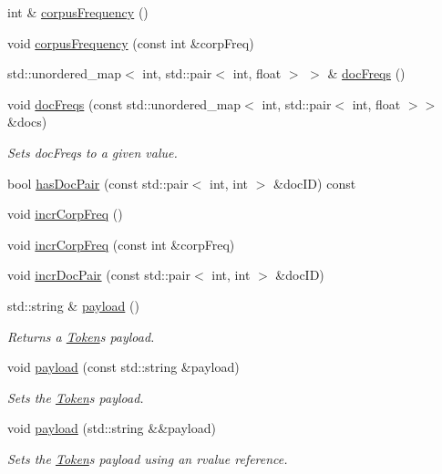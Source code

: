 \begin{DoxyCompactItemize}
int \& \hyperlink{class_token_a2f643ffd68e0d9f6fc3a812337cba728}{corpus\+Frequency} ()
\item 
void \hyperlink{class_token_a96f7a2357460942a79f4c83edfc5328e}{corpus\+Frequency} (const int \&corp\+Freq)
\item 
std\+::unordered\+\_\+map$<$ int, std\+::pair$<$ int, float $>$ $>$ \& \hyperlink{class_token_ae6baab69fb2340897f5a96a824b59296}{doc\+Freqs} ()
\item 
void \hyperlink{class_token_ad72b4a41e4b59f38a60749f4f5f7d839}{doc\+Freqs} (const std\+::unordered\+\_\+map$<$ int, std\+::pair$<$ int, float $>$$>$ \&docs)
\begin{DoxyCompactList}\small\item\em Sets doc\+Freqs to a given value. \end{DoxyCompactList}\item 
bool \hyperlink{class_token_ae3802c4c2b1a3daf2de8e72eee09fb57}{has\+Doc\+Pair} (const std\+::pair$<$ int, int $>$ \&doc\+I\+D) const 
\item 
void \hyperlink{class_token_a7131e0dbc8f28dd91b0adfb40064addc}{incr\+Corp\+Freq} ()
\item 
void \hyperlink{class_token_a9624e44c95f3c6a1eaca03b384d96ed3}{incr\+Corp\+Freq} (const int \&corp\+Freq)
\item 
void \hyperlink{class_token_a067a9966459518c42bdeff937b5e25c8}{incr\+Doc\+Pair} (const std\+::pair$<$ int, int $>$ \&doc\+I\+D)
\item 
std\+::string \& \hyperlink{class_token_a518dac411db3279a9b2f4ce38e46d199}{payload} ()
\begin{DoxyCompactList}\small\item\em Returns a \hyperlink{class_token}{Token}\textquotesingle{}s payload. \end{DoxyCompactList}\item 
void \hyperlink{class_token_a434580f0f776406d65ecd0985acd1f34}{payload} (const std\+::string \&payload)
\begin{DoxyCompactList}\small\item\em Sets the \hyperlink{class_token}{Token}\textquotesingle{}s payload. \end{DoxyCompactList}\item 
void \hyperlink{class_token_ab4ef7da254223df781029a400d928350}{payload} (std\+::string \&\&payload)
\begin{DoxyCompactList}\small\item\em Sets the \hyperlink{class_token}{Token}\textquotesingle{}s payload using an rvalue reference. \end{DoxyCompactList}\end{DoxyCompactItemize}
